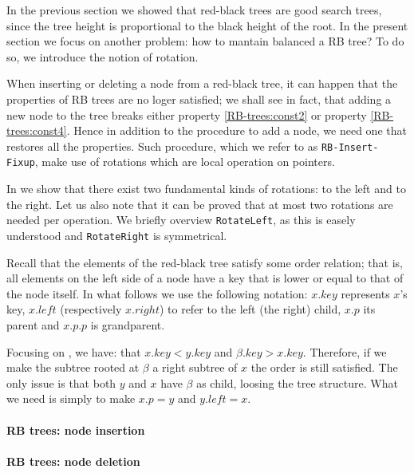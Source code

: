 \documentclass{subfiles}
\begin{document}
    In the previous section we showed that red-black trees are good search trees,
        since the tree height is proportional to the black height of the root. 
        In the present section we focus on another problem: how to mantain balanced a RB tree?    
        To do so, we introduce the notion of rotation.

    When inserting or deleting a node from a red-black tree,
        it can happen that the properties of RB trees are no loger satisfied;
        we shall see in fact, that adding a new node to the tree breaks either property 
        \ref{RB-trees:const2}  or property \ref{RB-trees:const4}.
        Hence in addition to the procedure to add a node, 
        we need one that restores all the properties. 
        Such procedure, which we refer to as \lstinline{RB-Insert-Fixup},
        make use of rotations which are local operation on pointers. 
        
        

    In  we show that there exist two fundamental kinds of rotations: 
        to the left and to the right. Let us also note that it can be proved that at most 
        two rotations are needed per operation. We briefly overview \lstinline{RotateLeft},
        as this is easely understood and \lstinline{RotateRight} is symmetrical.

    Recall that the elements of the red-black tree satisfy some order relation;
        that is, all elements on the left side of a node have a key that is lower 
        or equal to that of the node itself. In what follows we use the following 
        notation: \(x.key\) represents \(x\)'s key, \(x.left\) (respectively \(x.right\))
        to refer to the left (the right) child, \(x.p\) its parent and \(x.p.p\)
        is grandparent.

    Focusing on , we have: that \(x.key < y.key\) and \(\beta.key > x.key\).
        Therefore, if we make the subtree rooted at \(\beta\) a right subtree of \(x\)
        the order is still satisfied. The only issue is that both \(y\) and \(x\)
        have \(\beta\) as child, loosing the tree structure. What we need is simply to 
        make \(x.p = y\) and \(y.left = x\).


    \paragraph*{RB trees: node insertion}
    
   
    \paragraph*{RB trees: node deletion}
    
\end{document}
